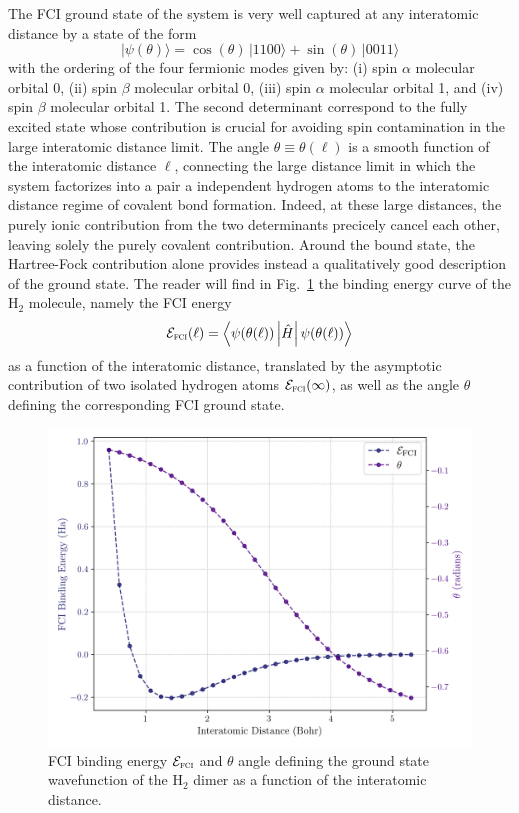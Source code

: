 \documentclass[aps, prl, twocolumn, groupedaddress, reprint, floatfix, nofootinbib, longbibliography]{revtex4-2}
\begin{document}
        The FCI ground state of the system is very well captured at any interatomic distance by a state of the form
        \begin{equation}
            |\psi(\theta)\rangle = \cos(\theta)\,|1100\rangle + \sin(\theta)\,|0011\rangle
        \end{equation}
        with the ordering of the four fermionic modes given by: (i) spin $\alpha$ molecular orbital 0, (ii) spin $\beta$ molecular orbital 0, (iii) spin $\alpha$ molecular orbital 1, and (iv) spin $\beta$ molecular orbital 1. The second determinant correspond to the fully excited state whose contribution is crucial for avoiding spin contamination in the large interatomic distance limit. The angle $\theta\equiv\theta(\ell)$ is a smooth function of the interatomic distance $\ell$, connecting the large distance limit in which the system factorizes into a pair a independent hydrogen atoms to the interatomic distance regime of covalent bond formation. Indeed, at these large distances, the purely ionic contribution from the two determinants precicely cancel each other, leaving solely the purely covalent contribution. Around the bound state, the Hartree-Fock contribution alone provides instead a qualitatively good description of the ground state. The reader will find in Fig.~\ref{fig:binding_theta} the binding energy curve of the H$_2$ molecule, namely the FCI energy
        \begin{equation}
            \mathcal E_\textsc{fci}(\ell) = \left\langle\psi(\theta(\ell))\left|\hat{H}\right|\psi(\theta(\ell))\right\rangle
        \end{equation}
        as a function of the interatomic distance, translated by the asymptotic contribution of two isolated hydrogen atoms $\mathcal E_\textsc{fci}(\infty)$, as well as the angle $\theta$ defining the corresponding FCI ground state.

        \begin{figure}[ht]
            \centering
                \includegraphics[width=0.5
                \textwidth]{figures/binding_theta.png}
                \caption{FCI binding energy $\mathcal E_\textsc{fci}$ and $\theta$ angle defining the ground state wavefunction of the H$_2$ dimer as a function of the interatomic distance.}
        \label{fig:binding_theta}
        \end{figure}
\end{document}
